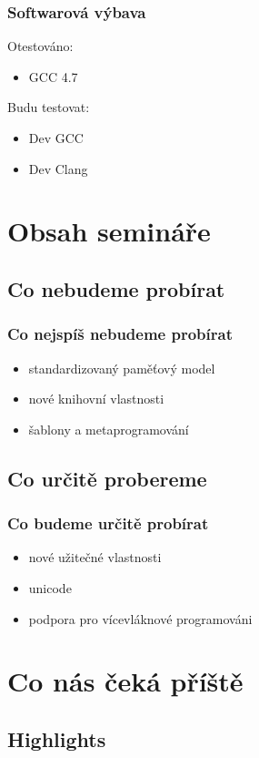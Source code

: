 \begin{frame}
	\frametitle{Softwarová výbava}
	Otestováno:
	\begin{itemize}
		\item GCC 4.7
	\end{itemize} \pause
	Budu testovat:
	\begin{itemize}
		\item Dev GCC
		\item Dev Clang
	\end{itemize}
\end{frame}


\section{Obsah semináře}
\subsection{Co nebudeme probírat}

\begin{frame}
	\frametitle{Co nejspíš nebudeme probírat}
	\begin{itemize}
		\item standardizovaný paměťový model
		\item nové knihovní vlastnosti
		\item šablony a metaprogramování
	\end{itemize}
\end{frame}

\subsection{Co určitě probereme}

\begin{frame}
	\frametitle{Co budeme určitě probírat}
	\begin{itemize}
		\item nové užitečné vlastnosti
		\item unicode
		\item podpora pro vícevláknové programováni
	\end{itemize}
\end{frame}

\section{Co nás čeká příště}
\subsection{Highlights}

